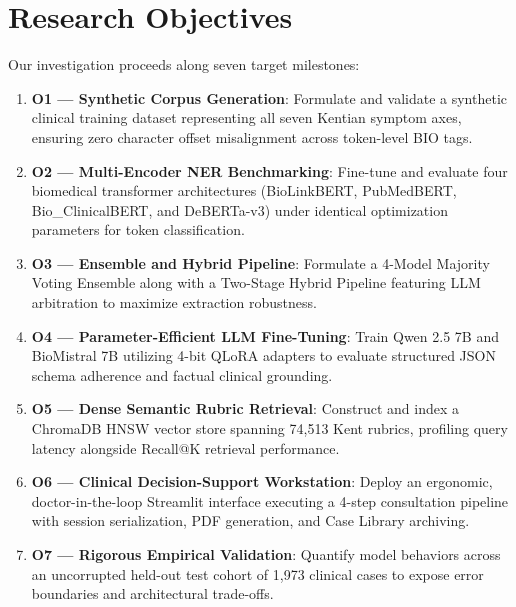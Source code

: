 
\section{Research Objectives}

Our investigation proceeds along seven target milestones:

\begin{enumerate}
  \item \textbf{O1 --- Synthetic Corpus Generation}: Formulate and validate a synthetic clinical training dataset representing all seven Kentian symptom axes, ensuring zero character offset misalignment across token-level BIO tags.

  \item {\raggedright \textbf{O2 --- Multi-Encoder NER Benchmarking}: Fine-tune and evaluate four biomedical transformer architectures (BioLinkBERT, PubMedBERT, Bio\_ClinicalBERT, and DeBERTa-v3) under identical optimization parameters for token classification.\par}

  \item \textbf{O3 --- Ensemble and Hybrid Pipeline}: Formulate a 4-Model Majority Voting Ensemble along with a Two-Stage Hybrid Pipeline featuring LLM arbitration to maximize extraction robustness.

  \item \textbf{O4 --- Parameter-Efficient LLM Fine-Tuning}: Train Qwen 2.5 7B and BioMistral 7B utilizing 4-bit QLoRA adapters to evaluate structured JSON schema adherence and factual clinical grounding.

  \item \textbf{O5 --- Dense Semantic Rubric Retrieval}: Construct and index a ChromaDB HNSW vector store spanning 74,513 Kent rubrics, profiling query latency alongside Recall@K retrieval performance.

  \item \textbf{O6 --- Clinical Decision-Support Workstation}: Deploy an ergonomic, doctor-in-the-loop Streamlit interface executing a 4-step consultation pipeline with session serialization, PDF generation, and Case Library archiving.

  \item \textbf{O7 --- Rigorous Empirical Validation}: Quantify model behaviors across an uncorrupted held-out test cohort of 1,973 clinical cases to expose error boundaries and architectural trade-offs.
\end{enumerate}

